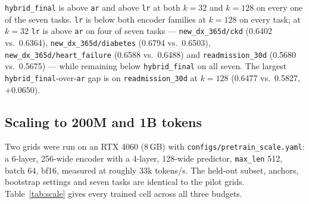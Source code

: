 \documentclass[11pt,a4paper]{article}
\newcommand{\code}[1]{\texttt{\small #1}}
\begin{document}
\code{hybrid\_final} is above \code{ar} and above \code{lr} at both $k{=}32$
and $k{=}128$ on every one of the seven tasks. \code{lr} is below both
encoder families at $k{=}128$ on every task; at $k{=}32$ \code{lr} is above
\code{ar} on four of seven tasks --- \code{new\_dx\_365d/ckd} (0.6402 vs.\
0.6364), \code{new\_dx\_365d/diabetes} (0.6794 vs.\ 0.6503),
\code{new\_dx\_365d/heart\_failure} (0.6588 vs.\ 0.6488) and
\code{readmission\_30d} (0.5680 vs.\ 0.5675) --- while remaining below
\code{hybrid\_final} on all seven. The largest \code{hybrid\_final}-over-\code{ar}
gap is on \code{readmission\_30d} at $k{=}128$ (0.6477 vs.\ 0.5827, $+0.0650$).

\subsection{Scaling to 200M and 1B tokens}
\label{sec:scale}

Two grids were run on an RTX 4060 (8\,GB) with
\code{configs/pretrain\_scale.yaml}: a 6-layer, 256-wide encoder with a 4-layer,
128-wide predictor, \code{max\_len} 512, batch 64, bf16, measured at roughly
33k tokens/s. The held-out subset, anchors, bootstrap settings and seven tasks
are identical to the pilot grids. Table~\ref{tab:scale} gives every trained cell
across all three budgets.
\end{document}
